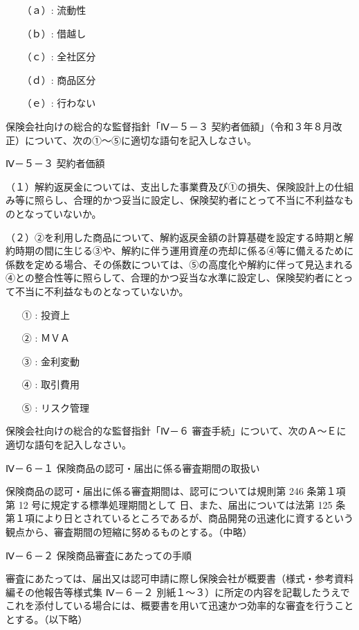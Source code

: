 \documentclass[report,gutter=10mm,fore-edge=10mm,uplatex,dvipdfmx]{jlreq}
\begin{document}
\answer{}
\begin{itemize}
\item[ （ａ）: ]  流動性
\item[ （ｂ）: ]  借越し
\item[ （ｃ）: ]  全社区分
\item[ （ｄ）: ]  商品区分
\item[ （ｅ）: ]  行わない
\end{itemize}


保険会社向けの総合的な監督指針「Ⅳ－５－３ 契約者価額」（令和３年８月改正）について、次の①～⑤に適切な語句を記入しなさい。

Ⅳ－５－３ 契約者価額

（１）解約返戻金については、支出した事業費及び①の損失、保険設計上の仕組み等に照らし、合理的かつ妥当に設定し、保険契約者にとって不当に不利益なものとなっていないか。

（２）②を利用した商品について、解約返戻金額の計算基礎を設定する時期と解約時期の間に生じる③や、解約に伴う運用資産の売却に係る④等に備えるために係数を定める場合、その係数については、⑤の高度化や解約に伴って見込まれる④との整合性等に照らして、合理的かつ妥当な水準に設定し、保険契約者にとって不当に不利益なものとなっていないか。

\answer{}
\begin{itemize}
\item[ ① : ] 投資上 
\item[ ② : ] ＭＶＡ 
\item[ ③ : ] 金利変動
\item[ ④ : ] 取引費用 
\item[ ⑤ : ] リスク管理
\end{itemize}

保険会社向けの総合的な監督指針「Ⅳ－６ 審査手続」について、次のＡ～Ｅに適切な語句を記入しなさい。

Ⅳ－６－１ 保険商品の認可・届出に係る審査期間の取扱い

保険商品の認可・届出に係る審査期間は、認可については規則第 246 条第１項第 12 号に規定する標準処理期間として
日、また、届出については法第 125 条第１項により日とされているところであるが、商品開発の迅速化に資するという観点から、審査期間の短縮に努めるものとする。（中略）

Ⅳ－６－２ 保険商品審査にあたっての手順

審査にあたっては、届出又は認可申請に際し保険会社が概要書（様式・参考資料編その他報告等様式集 Ⅳ－６－２ 別紙１～３）に所定の内容を記載したうえでこれを添付している場合には、概要書を用いて迅速かつ効率的な審査を行うこととする。（以下略）
\end{document}

